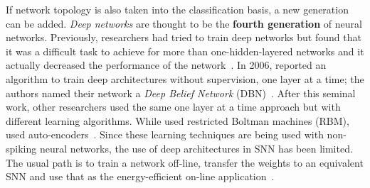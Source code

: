 If network topology is also taken into the classification basis, a new generation can be added. \emph{Deep networks} are thought to be the \textbf{fourth generation} of neural networks. Previously, researchers had tried to train deep networks but found that it was a difficult task to achieve for more than one-hidden-layered networks and it actually decreased the performance of the network~\cite{learning-deep-Bengio2009}. In 2006, \citeauthor{hinton2006fast} reported an algorithm to train deep architectures without supervision, one layer at a time; the authors named their network a \emph{Deep Belief Network} (DBN)~\cite{hinton2006fast}. After this seminal work, other researchers used the same one layer at a time  approach but with different learning algorithms. While \citeauthor{hinton2006fast} used restricted Boltman machines (RBM), \citeauthor{autoencoders-lecun2007} used auto-encoders~\cite{autoencoders-lecun2007}. Since these learning techniques are being used with non-spiking neural networks, the use of deep architectures in SNN has been limited. The usual path is to train a network off-line, transfer the weights to an equivalent SNN and use that as the energy-efficient on-line application~\cite{evangelos-deep-belief,diehlfast-deep-net}.